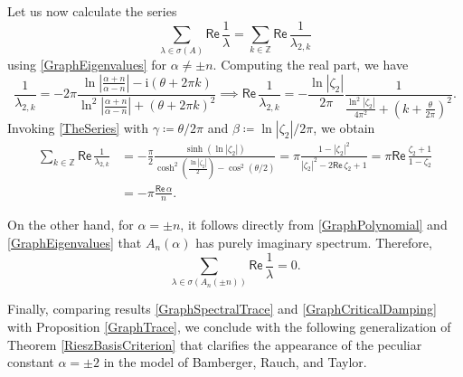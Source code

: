 \documentclass[11pt, a4paper,reqno]{amsart}
\theoremstyle{plain}
\theoremstyle{definition}
\theoremstyle{remark}
\newcommand{\1}{\mathds 1}
\renewcommand{\Re}{\mathsf{Re}\,}
\begin{document}
Let us now calculate the series
\[
\sum_{\lambda\in\sigma(A)}\Re \frac{1}{\lambda} = \sum_{k\in\mathbb Z}\Re\frac{1}{\lambda_{2,k}}
\]
using \eqref{GraphEigenvalues} for $\alpha \neq \pm n$. Computing the real part, we have
\[
\frac{1}{\lambda_{2,k}} = - 2\pi \frac{\ln\left|\frac{\alpha + n}{\alpha - n}\right| - \mathrm{i}(\theta + 2\pi k)}{\ln^2\left|\frac{\alpha + n}{\alpha - n}\right| + (\theta + 2\pi k)^2} \implies \Re \frac{1}{\lambda_{2,k}} = -\frac{\ln\left|\zeta_2\right|}{2\pi}\frac{1}{\frac{\ln^2\left|\zeta_2\right|}{4\pi^2} + \left(k + \frac{\theta}{2\pi}\right)^2}.
\]
Invoking \eqref{TheSeries} with $\gamma \coloneqq \theta/2\pi$ and $\beta \coloneqq \ln\left|\zeta_2\right|/2\pi$, we obtain
\begin{align}
\sum_{k\in \mathbb Z}\Re \frac{1}{\lambda_{2, k}} &= -\frac{\pi}{2} \frac{\sinh(\ln|\zeta_2|)}{\cosh^2\left(\frac{\ln|\zeta_2|}{2}\right) - \cos^2(\theta/2)} = \pi \frac{1-|\zeta_2|^2}{|\zeta_2|^2 - 2 \Re \zeta_2 + 1} = \pi \Re \frac{\zeta_2 + 1}{1-\zeta_2} \nonumber\\
&= -\pi\frac{\Re\alpha}{n}.
\label{GraphSpectralTrace}
\end{align}


On the other hand, for $\alpha = \pm n$, it follows directly from \eqref{GraphPolynomial} and \eqref{GraphEigenvalues} that $A_n(\alpha)$ has purely imaginary spectrum. Therefore,
\begin{equation}
\sum_{\lambda \in \sigma(A_n(\pm n))} \Re \frac{1}{\lambda} = 0.
\label{GraphCriticalDamping}
\end{equation}

Finally, comparing results \eqref{GraphSpectralTrace} and \eqref{GraphCriticalDamping} with Proposition \ref{GraphTrace}, we conclude with the following generalization of Theorem \ref{RieszBasisCriterion} that clarifies the appearance of the peculiar constant $\alpha = \pm 2$ in the model of Bamberger, Rauch, and Taylor.
\end{document}
